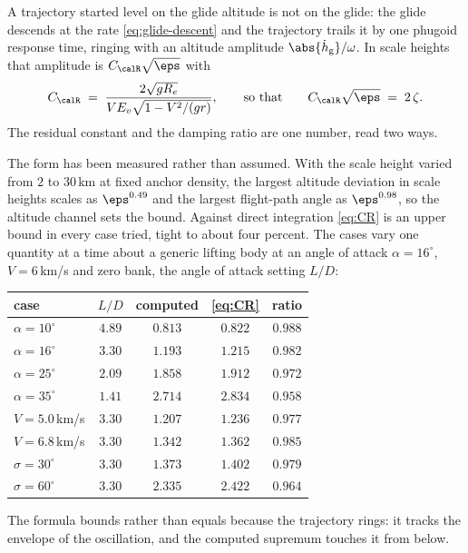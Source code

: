 A trajectory started level on the glide altitude is not on the glide: the
glide descends at the rate \cref{eq:glide-descent} and the trajectory
trails it by one phugoid response time, ringing with an altitude amplitude
$\abs{\dot h_{\mathrm{g}}}/\omega$. In scale heights that amplitude is
$C_{\calR}\sqrt{\eps}$ with
\begin{equation}\label{eq:CR}
  C_{\calR} \;=\; \frac{2\sqrt{g R_e}}{V E_v\sqrt{1 - V^2/(gr)}} ,
  \qquad\text{so that}\qquad
  C_{\calR}\sqrt{\eps} \;=\; 2\,\zeta .
\end{equation}
The residual constant and the damping ratio are one number, read two ways.

The form has been measured rather than assumed. With the scale height
varied from $2$ to $30$\,km at fixed anchor density, the largest altitude
deviation in scale heights scales as $\eps^{0.49}$ and the largest
flight-path angle as $\eps^{0.98}$, so the altitude channel sets the bound.
Against direct integration \cref{eq:CR} is an upper bound in every case
tried, tight to about four percent. The cases vary one quantity at a time
about a generic lifting body at an angle of attack $\alpha = 16^\circ$,
$V = 6$\,km/s and zero bank, the angle of attack setting $L/D$:
\begin{center}
\begin{tabular}{@{}lcccc@{}}
\toprule
case & $L/D$ & computed & \cref{eq:CR} & ratio \\
\midrule
$\alpha = 10^\circ$ & $4.89$ & $0.813$ & $0.822$ & $0.988$ \\
$\alpha = 16^\circ$ & $3.30$ & $1.193$ & $1.215$ & $0.982$ \\
$\alpha = 25^\circ$ & $2.09$ & $1.858$ & $1.912$ & $0.972$ \\
$\alpha = 35^\circ$ & $1.41$ & $2.714$ & $2.834$ & $0.958$ \\
$V = 5.0$\,km/s & $3.30$ & $1.207$ & $1.236$ & $0.977$ \\
$V = 6.8$\,km/s & $3.30$ & $1.342$ & $1.362$ & $0.985$ \\
$\sigma = 30^\circ$ & $3.30$ & $1.373$ & $1.402$ & $0.979$ \\
$\sigma = 60^\circ$ & $3.30$ & $2.335$ & $2.422$ & $0.964$ \\
\bottomrule
\end{tabular}
\end{center}
The formula bounds rather than equals because the trajectory rings: it
tracks the envelope of the oscillation, and the computed supremum touches it
from below.

